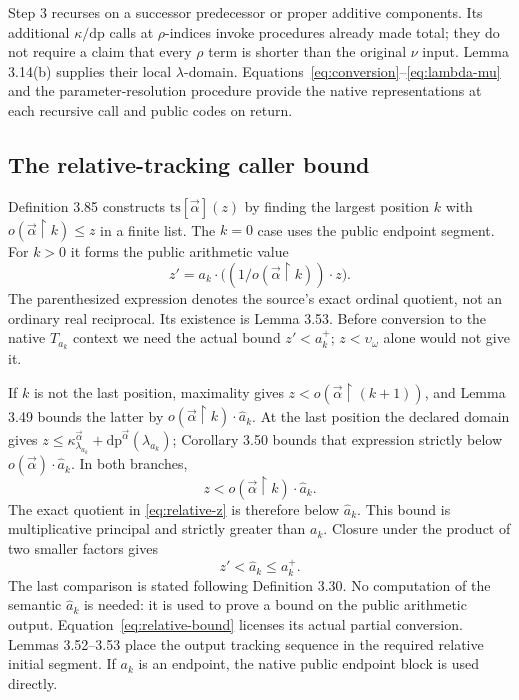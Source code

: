 \documentclass[11pt]{article}
\newcommand{\up}{\upsilon}
\begin{document}
Step 3 recurses on a successor predecessor or proper additive
components. Its additional $\kappa/\mathrm{dp}$ calls at
$\rho$-indices invoke procedures already made total; they do not
require a claim that every $\rho$ term is shorter than the original
$\nu$ input. Lemma 3.14(b) supplies their local $\lambda$-domain.
Equations~\eqref{eq:conversion}--\eqref{eq:lambda-mu} and the
parameter-resolution procedure provide the native representations
at each recursive call and public codes on return.

\subsection{The relative-tracking caller bound}

Definition 3.85 constructs $\mathrm{ts}[\vec{\alpha}](z)$ by
finding the largest position $k$ with
$o(\vec{\alpha}\upharpoonright k)\le z$ in a finite list.
The $k=0$ case uses the public endpoint segment. For $k>0$ it
forms the public arithmetic value
\begin{equation}\label{eq:relative-z}
 z'=a_k\cdot\bigl((1/o(\vec{\alpha}\upharpoonright k))\cdot z\bigr).
\end{equation}
The parenthesized expression denotes the source's exact ordinal
quotient, not an ordinary real reciprocal. Its existence is
Lemma 3.53. Before conversion to the native $T_{a_k}$ context we
need the actual bound $z'<a_k^+$; $z<\up_\omega$ alone would not
give it.

If $k$ is not the last position, maximality gives
$z<o(\vec{\alpha}\upharpoonright(k+1))$, and Lemma 3.49
bounds the latter by
$o(\vec{\alpha}\upharpoonright k)\cdot\widehat a_k$.
At the last position the declared domain gives
$z\le\kappa^{\vec{\alpha}}_{\lambda_{a_k}}+
\mathrm{dp}^{\vec{\alpha}}(\lambda_{a_k})$;
Corollary 3.50 bounds that expression strictly below
$o(\vec{\alpha})\cdot\widehat a_k$. In both branches,
\[
 z<o(\vec{\alpha}\upharpoonright k)\cdot\widehat a_k.
\]
The exact quotient in \eqref{eq:relative-z} is therefore below
$\widehat a_k$. This bound is multiplicative principal and strictly
greater than $a_k$. Closure under the product of two smaller
factors gives
\begin{equation}\label{eq:relative-bound}
 z'<\widehat a_k\le a_k^+.
\end{equation}
The last comparison is stated following Definition 3.30.
No computation of the semantic $\widehat a_k$ is needed: it is
used to prove a bound on the public arithmetic output.
Equation~\eqref{eq:relative-bound} licenses its actual partial
conversion. Lemmas 3.52--3.53 place the output tracking sequence
in the required relative initial segment. If $a_k$ is an endpoint,
the native public endpoint block is used directly.
\end{document}
